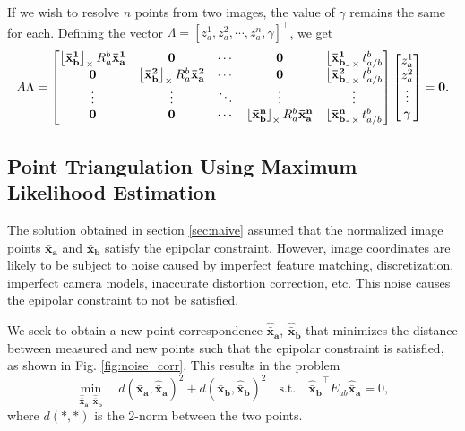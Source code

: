 	
	If we wish to resolve $n$ points from two images, the value of $\gamma$ remains the same for each. Defining the vector $\Lambda = [z_a^1, z_a^2, \cdots, z_a^n, \gamma]^\top$, we get
	\begin{equation}
	A\Lambda = \left[\begin{matrix}\ss{\mathbf{\bar{x}_b^1}} R_a^b \mathbf{\bar{x}_a^1} & \mathbf{0} & \cdots & \mathbf{0} & \ss{\mathbf{\bar{x}_b^1}} t_{a/b}^b \\ \mathbf{0} & \ss{\mathbf{\bar{x}_b^2}} R_a^b \mathbf{\bar{x}_a^2} & \cdots & \mathbf{0} & \ss{\mathbf{\bar{x}_b^2}} t_{a/b}^b \\ \vdots & \vdots & \ddots & \vdots & \vdots \\ \mathbf{0} & \mathbf{0} & \cdots & \ss{\mathbf{\bar{x}_b^n}} R_a^b \mathbf{\bar{x}_a^n} & \ss{\mathbf{\bar{x}_b^n}} t_{a/b}^b \end{matrix}\right] \left[ \begin{matrix} z_a^1 \\ z_a^2 \\ \vdots \\ \gamma \end{matrix}\right] = \mathbf{0}.
	\end{equation}
	
	\subsection{Point Triangulation Using Maximum Likelihood Estimation}
	\label{sec:mle_triang}
	
	
	The solution obtained in section \ref{sec:naive} assumed that the normalized image points $\mathbf{\bar{x}_a}$ and $\mathbf{\bar{x}_b}$ satisfy the epipolar constraint. However, image coordinates are likely to be subject to noise caused by imperfect feature matching, discretization, imperfect camera models, inaccurate distortion correction, etc. This noise causes the epipolar constraint to not be satisfied. 
	
	We seek to obtain a new point correspondence $\mathbf{\hat{\bar{x}}_a}$, $\mathbf{\hat{\bar{x}}_b}$ that minimizes the distance between measured and new points such that the epipolar constraint is satisfied, as shown in Fig. \ref{fig:noise_corr}. This results in the problem
	\begin{equation}
	\min_{\mathbf{\hat{\bar{x}}_a},\mathbf{\hat{\bar{x}}_b}} \quad d(\mathbf{\bar{x}_a}, \mathbf{\hat{\bar{x}}_a})^2 + d(\mathbf{\bar{x}_b}, \mathbf{\hat{\bar{x}}_b})^2 \quad \text{s.t.} \quad \mathbf{\hat{\bar{x}}_b}^\top E_{ab} \mathbf{\hat{\bar{x}}_a} = 0,
	\label{eq:cost}
	\end{equation}
	where $d(*,*)$ is the 2-norm between the two points. 
	
